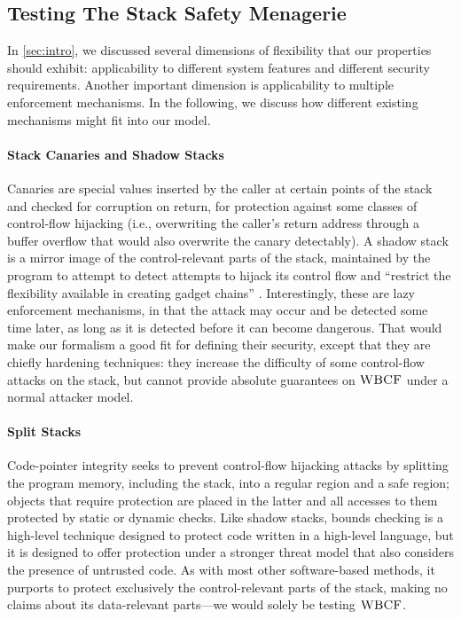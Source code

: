 \documentclass[10pt,conference]{ieeetran}%
\theoremstyle{definition}
\begin{document}
\subsection{Testing The Stack Safety Menagerie}

In \cref{sec:intro}, we discussed several dimensions of flexibility
that our properties should exhibit: applicability to different system
features and different security requirements. Another important dimension
is applicability to multiple enforcement mechanisms.
In the following, we discuss how different existing mechanisms
might fit into our model.

\paragraph{Stack Canaries and Shadow Stacks}
%
Canaries are special values inserted by the caller at certain points of the
stack and checked for corruption on return, for protection against
some classes of control-flow hijacking (i.e., overwriting the caller's
return address through a buffer overflow that would also overwrite the canary
detectably). A shadow stack is a mirror image of the control-relevant parts of the stack,
maintained by the program to attempt to detect attempts to hijack its control
flow and ``restrict the flexibility available in creating gadget chains''
\cite{Shanbhogue+19}.
%
Interestingly, these are lazy enforcement mechanisms, in that
the attack may occur and be detected some time later, as long as
it is detected before it can become dangerous. That would make our
formalism a good fit for defining their security, except that
they are chiefly hardening techniques: they increase the difficulty
of some control-flow attacks on the stack, but cannot provide absolute
guarantees on \(\textnormal{\sc WBCF}\) under a normal attacker model.

\paragraph{Split Stacks}
%
Code-pointer integrity seeks to prevent control-flow hijacking attacks by
splitting the program memory, including the stack, into a regular region and a
safe region; objects that require protection are placed in the latter and
all accesses to them protected by static or dynamic checks.
%
Like shadow stacks, bounds checking is a high-level technique designed to
protect code written in a high-level language, but it is designed to
offer protection under a stronger threat model that also considers the presence
of untrusted code. As with most other software-based methods, it purports to
protect exclusively the control-relevant parts of the stack, making no claims
about its data-relevant parts---we would solely be testing \(\textnormal{\sc WBCF}\).
\end{document}
